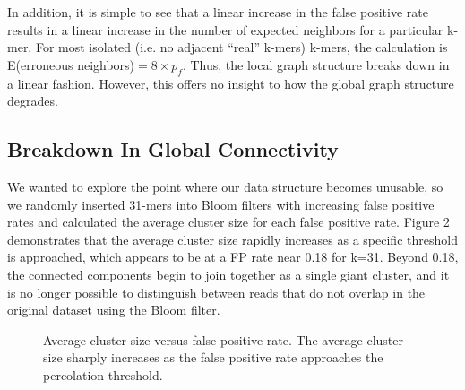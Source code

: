 \documentclass[12pt]{article} \usepackage{simplemargins}
\begin{document}
In addition, it is simple to see that a linear increase in the false 
positive rate results in a linear increase in the number of expected 
neighbors for a particular k-mer. For most isolated (i.e. no adjacent 
``real'' k-mers) k-mers, the calculation is 
E(erroneous neighbors)$ = 8 \times p_f$. Thus, the local graph 
structure breaks down in a linear fashion. However, this offers no insight 
to how the global graph structure degrades.

\subsection{Breakdown In Global Connectivity}
We wanted to explore the point where our data structure becomes unusable, 
so we randomly inserted 31-mers into Bloom
filters with increasing false positive rates and calculated the average
cluster size for each false positive rate. Figure 2 demonstrates that 
the average cluster
size rapidly increases as a specific threshold is approached,
which appears to be at a FP rate near 0.18 for k=31. Beyond 0.18, 
the connected components begin to join together as a single giant 
cluster, and it is no longer possible to distinguish between reads 
that do not overlap in the original dataset using the Bloom filter.

\begin{figure}
\caption{Average cluster size versus false positive rate. The average 
cluster size sharply increases as the false positive 
rate approaches the percolation threshold.
}
\end{figure}
\end{document}
